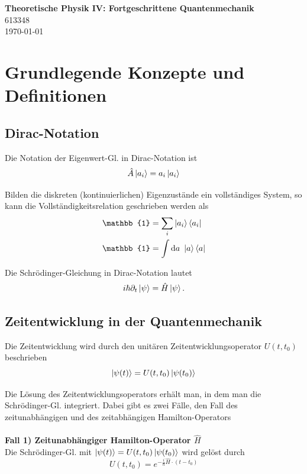 \documentclass{article}
\newcommand{\diff}{\mathrm{d}}
\begin{document}
\begin{center}
	\Large{\textbf{Theoretische Physik IV: Fortgeschrittene Quantenmechanik}}\\
	\small{613348}\\
	\small{\today}
\end{center}

\tableofcontents


\newpage


\section{Grundlegende Konzepte und Definitionen}
\subsection{Dirac-Notation}
Die Notation der Eigenwert-Gl. in Dirac-Notation ist
	\begin{equation}
		\hat{A}\ket{a_i} = a_i\ket{a_i}
	\end{equation}

Bilden die diskreten (kontinuierlichen) Eigenzustände ein vollständiges System, so kann die Vollständigkeitsrelation geschrieben werden als
	\begin{align}
		\mathbb{1} &= \sum_{i} \ket{a_i}\bra{a_i}\\
		\mathbb{1} &= \int \diff a\ \ket{a}\bra{a}
	\end{align}

Die Schrödinger-Gleichung in Dirac-Notation lautet
	\begin{equation}
		i\hbar\partial_t\ket{\psi} = \hat{H}\ket{\psi}.
	\end{equation}


\newpage


\subsection{Zeitentwicklung in der Quantenmechanik}
Die Zeitentwicklung wird durch den unitären Zeitentwicklungsoperator $U(t,t_0)$ beschrieben
	\begin{equation}
		\ket{\psi(t)} = U(t,t_0)\ket{\psi(t_0)}
	\end{equation}

Die Lösung des Zeitentwicklungsoperators erhält man, in dem man die Schrödinger-Gl. integriert. Dabei gibt es zwei Fälle, den Fall des zeitunabhängigen und des zeitabhängigen Hamilton-Operators\\
\\
\textbf{Fall 1) Zeitunabhängiger Hamilton-Operator $\hat{H}$}\\
Die Schrödinger-Gl. mit $\ket{\psi(t)} = U(t,t_0)\ket{\psi(t_0)}$ wird gelöst durch
	\begin{equation}
		U(t,t_0) = e^{-\frac{i}{\hbar}\hat{H}\cdot (t-t_0)}
	\end{equation}
\end{document}
